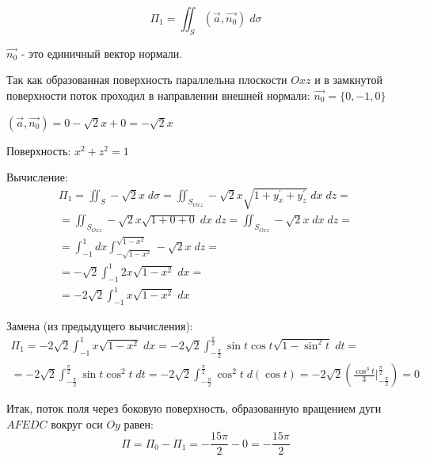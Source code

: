 \begin{enumerate}
\begin{equation*}
    \Pi_{1} = \iint_{S} (\Vec{a}, \Vec{n_{0}})\; d\sigma
\end{equation*}

$\Vec{n_{0}}$ - это единичный вектор нормали.

Так как образованная поверхность  параллельна плоскости $Oxz$ и в замкнутой поверхности поток проходил в направлении внешней нормали: $\Vec{n_{0}} = \{0,-1,0\}$

$(\Vec{a}, \Vec{n_{0}}) = 0 - \sqrt{2}x + 0 = -\sqrt{2}x$

Поверхность: $x^2 + z^2 = 1$

Вычисление:
\begin{align*}
    \Pi_{1} = \iint_{S} -\sqrt{2}x\; d\sigma = \iint_{S_{Oxz}} -\sqrt{2}x  \sqrt{1 + y_{x}^\prime + y_{z}^\prime}\; dx\;dz
    =\\=
    \iint_{S_{Oxz}} -\sqrt{2}x \sqrt{1 + 0 + 0}\; dx\;dz = \iint_{S_{Oxz}} -\sqrt{2}x \;dx\;dz
    =\\=
    \int_{-1}^{1}dx\int_{-\sqrt{1-x^2}}^{\sqrt{1-x^2}} -\sqrt{2}x \;dz
    =\\=
    -\sqrt{2}\int_{-1}^{1}2x\sqrt{1-x^2}\;dx
    =\\=
    -2\sqrt{2}\int_{-1}^{1}x\sqrt{1-x^2}\;dx
\end{align*}

Замена (из предыдущего вычисления):
\begin{align*}
    \Pi_{1} = -2\sqrt{2}\int_{-1}^{1}x\sqrt{1-x^2}\;dx = -2\sqrt{2}\int_{-\frac{\pi}{2}}^{\frac{\pi}{2}}\sin{t}\cos{t}\sqrt{1-\sin^2{t}}\;dt
    =\\=
    -2\sqrt{2}\int_{-\frac{\pi}{2}}^{\frac{\pi}{2}}\sin{t}\cos^2{t}\;dt
    = -2\sqrt{2}\int_{-\frac{\pi}{2}}^{\frac{\pi}{2}}\cos^2{t}\;d(\cos{t}) = -2\sqrt{2} \left(\frac{\cos^3{t}}{3}\biggr|_{-\frac{\pi}{2}}^{\frac{\pi}{2}} \right) = 0
\end{align*}

Итак, поток поля через боковую поверхность, образованную вращением дуги $AFEDC$ вокруг оси $Oy$ равен:
\begin{equation*}
    \Pi = \Pi_{0} - \Pi_{1} = -\frac{15\pi}{2} - 0 = -\frac{15\pi}{2}
\end{equation*}
\end{enumerate}
